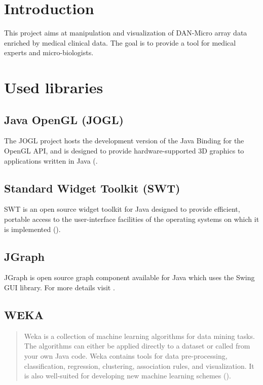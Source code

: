\chapter{Introduction}

This project aims at manipulation and visualization of DAN-Micro array data enriched by medical clinical data. The goal is to provide a tool for medical experts and micro-biologists.

\chapter{Used libraries}

\section{Java OpenGL (JOGL)}

The JOGL project hosts the development version of the Java Binding for the OpenGL API, and is designed to provide hardware-supported 3D graphics to applications written in Java (\citep{jogl:06}.

\section{Standard Widget Toolkit (SWT)}

SWT is an open source widget toolkit for Java designed to provide efficient, portable access to the user-interface facilities of the operating systems on which it is implemented (\citep{swt:06}).

\section{JGraph}

JGraph is open source graph component available for Java which uses the Swing GUI library. For more details visit \citep{jgraph:06}. 

\section{WEKA}

\begin{quotation}
Weka is a collection of machine learning algorithms for data mining tasks. The algorithms can either be applied directly to a dataset or called from your own Java code. Weka contains tools for data pre-processing, classification, regression, clustering, association rules, and visualization. It is also well-suited for developing new machine learning schemes (\citep{weka:06}).
\end{quotation}


